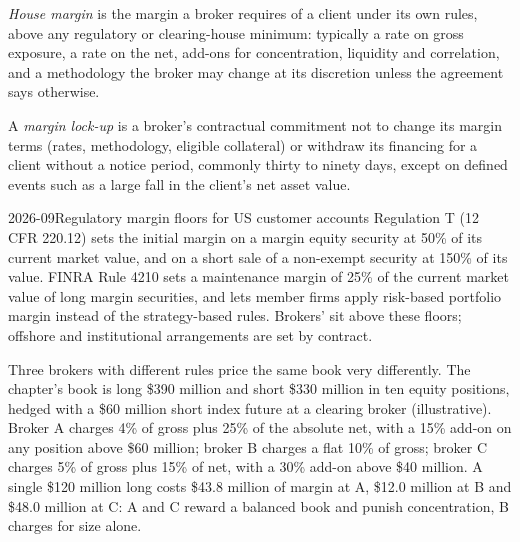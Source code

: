 \begin{definition}\label{def:fm:treasury-and-funding:house}
\emph{House margin} is the margin a broker requires of a client under its own rules, above any regulatory or clearing-house
minimum: typically a rate on gross exposure, a rate on the net, add-ons for concentration, liquidity and correlation, and a methodology the broker
may change at its discretion unless the agreement says otherwise.
\end{definition}

\begin{definition}\label{def:fm:treasury-and-funding:lockup}
A \emph{margin lock-up} is a broker's contractual commitment not to change its margin terms (rates, methodology, eligible
collateral) or withdraw its financing for a client without a notice period, commonly thirty to ninety days, except on defined events such as a
large fall in the client's net asset value.
\end{definition}

\begin{dated}{2026-09}{Regulatory margin floors for US customer accounts}\label{dat:fm:treasury-and-funding:rules}
Regulation T (12 CFR 220.12) sets the initial margin on a margin equity security at 50\% of its current market value, and on a short sale of a
non-exempt security at 150\% of its value. FINRA Rule 4210 sets a maintenance margin of 25\% of the current market value of long margin securities,
and lets member firms apply risk-based portfolio margin instead of the strategy-based rules. Brokers'  sit above these floors; offshore
and institutional arrangements are set by contract.
\end{dated}

Three brokers with different rules price the same book very differently. The chapter's book is long \$390 million and short \$330 million in ten
equity positions, hedged with a \$60 million short index future at a clearing broker (illustrative). Broker A charges 4\% of gross plus 25\% of
the absolute net, with a 15\% add-on on any position above \$60 million; broker B charges a flat 10\% of gross; broker C charges 5\% of gross plus
15\% of net, with a 30\% add-on above \$40 million. A single \$120 million long costs \$43.8 million of margin at A, \$12.0 million at B and \$48.0
million at C: A and C reward a balanced book and punish concentration, B charges for size alone.

